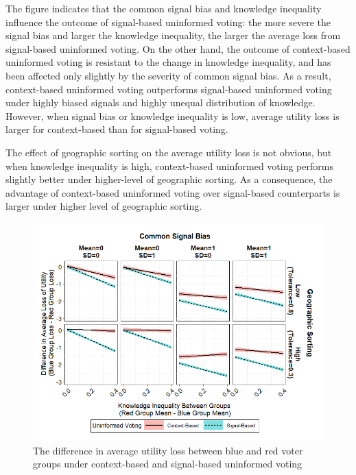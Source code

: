 \documentclass[letterpaper, 12pt]{article}
\begin{document}
    \par The figure indicates that the common signal bias and knowledge inequality influence the outcome of signal-based uninformed voting: the more severe the signal bias and larger the knowledge inequality, the larger the average loss from signal-based uninformed voting. On the other hand, the outcome of context-based uninformed voting is resistant to the change in knowledge inequality, and has been affected only slightly by the severity of common signal bias. As a result, context-based uninformed voting outperforms signal-based uninformed voting under highly biased signals and highly unequal distribution of knowledge. However, when signal bias or knowledge inequality is low, average utility loss is larger for context-based than for signal-based voting. 
    
    \par The effect of geographic sorting on the average utility loss is not obvious, but when knowledge inequality is high, context-based uninformed voting performs slightly better under higher-level of geographic sorting. As a consequence, the advantage of context-based uninformed voting over signal-based counterparts is larger under higher level of geographic sorting.

    \begin{figure}[t!]
        \caption{The difference in average utility loss between blue and red voter groups under context-based and signal-based uninformed voting}
        \label{fig:abmres4}
        \includegraphics[width=\linewidth]{../outputs/abmres4.png}
    \end{figure}
    
\end{document}
